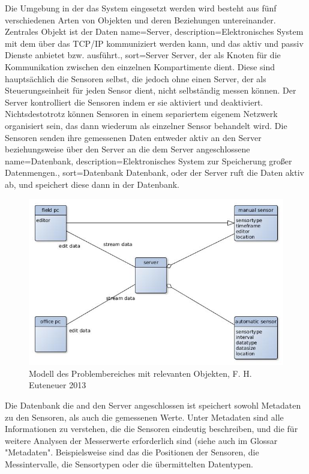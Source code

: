 Die Umgebung in der das System eingesetzt werden wird besteht aus fünf verschiedenen Arten von Objekten und deren Beziehungen untereinander. Zentrales Objekt ist der Daten 
{
  name={Server},
  description={Elektronisches System mit dem über das TCP/IP kommuniziert werden kann, und das aktiv und passiv Dienste anbietet bzw. ausführt.},
  sort=Server
}
\gls{Server}, der als Knoten für die Kommunikation zwischen den einzelnen Kompartimente dient. Diese sind hauptsächlich die Sensoren selbst, die jedoch ohne einen \gls{Server}, der als Steuerungseinheit für jeden Sensor dient, nicht selbständig messen können. Der \gls{Server} kontrolliert die Sensoren indem er sie aktiviert und deaktiviert. Nichtsdestotrotz können Sensoren in einem separiertem eigenem Netzwerk organisiert sein, das dann wiederum als einzelner Sensor behandelt wird. Die Sensoren senden ihre gemessenen Daten entweder aktiv an den \gls{Server} beziehungsweise über den \gls{Server} an die dem \gls{Server} angeschlossene 
{
  name={Datenbank},
  description={Elektronisches System zur Speicherung großer Datenmengen.},
  sort=Datenbank
}
\gls{Datenbank}, oder der \gls{Server} ruft die Daten aktiv ab, und speichert diese dann in der Datenbank.

\begin{figure}[H]
	\centering
 	 \includegraphics[scale=0.6]{graphics/model_of_issue.jpg} 
	\caption{Modell des Problembereiches mit relevanten Objekten, F. H. Euteneuer 2013}
	 \label{fig:model_domain}
\end{figure}

Die Datenbank die and den \gls{Server} angeschlossen ist speichert sowohl Metadaten zu den Sensoren, als auch die gemessenen Werte. Unter Metadaten sind alle Informationen zu verstehen, die die Sensoren eindeutig beschreiben, und die für weitere Analysen der Messerwerte erforderlich sind (siehe auch im Glossar "Metadaten". Beispielsweise sind das die Positionen der Sensoren, die Messintervalle, die Sensortypen oder die übermittelten Datentypen.

